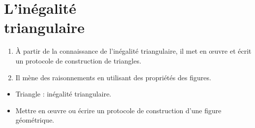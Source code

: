 \themaE
\graphicspath{{../../S15_Inegalite_triangulaire/Images/}}

\chapter{L'inégalité\\triangulaire}
\label{S15}

\def\pt{\psset{unit=4.24}\pspolygon(0,0)(1,0)(1,1)} 
\def\mt{\psset{unit=6}\pspolygon(0,0)(1,0)(1,1)} 
\def\gt{\psset{unit=8.49}\pspolygon(0,0)(1,0)(1,1)} 
\def\ca{\psset{unit=4.24}\psframe(0,0)(1,1)}
\def\pa{\psset{unit=3}\pspolygon(0,0)(-2,0)(-3,1)(-1,1)}
\def\pas{\psset{unit=3}\pspolygon(0,0)(-2,0)(-3,-1)(-1,-1)}


\begin{autoeval}
   \small
   \begin{enumerate}
      \item À partir de la connaissance de l’inégalité triangulaire, il met en \oe uvre et écrit un protocole de construction de triangles.
      \item Il mène des raisonnements en utilisant des propriétés des figures.
   \end{enumerate}
\end{autoeval}\begin{prerequis}
   \begin{itemize}
      \item Triangle : inégalité triangulaire.
      \item[\com] Mettre en \oe uvre ou écrire un protocole de construction d’une figure géométrique.
   \end{itemize}
\end{prerequis}

\vfill

